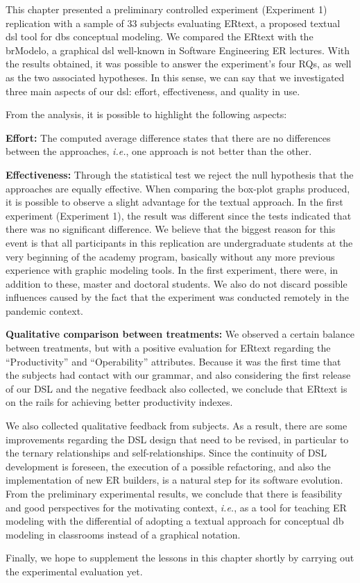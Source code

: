 This chapter presented a preliminary controlled experiment (Experiment 1) replication with a sample of 33 subjects evaluating ERtext, a proposed textual \ac{dsl} tool for \acp{db} conceptual modeling. 
We compared the ERtext with the brModelo, a graphical \ac{dsl} well-known in Software Engineering ER lectures. 
With the results obtained, it was possible to answer the experiment's four RQs, as well as the two associated hypotheses.
In this sense, we can say that we investigated three main aspects of our \ac{dsl}: effort, effectiveness, and quality in use.

From the analysis, it is possible to highlight the following aspects:

\item \textbf{Effort:} The computed average difference states that there are no differences between the approaches, \textit{i.e.}, one approach is not better than the other. 

\item \textbf{Effectiveness:} Through the statistical test we reject the null hypothesis that the approaches are equally effective. 
When comparing the box-plot graphs produced, it is possible to observe a slight advantage for the textual approach. 
In the first experiment (Experiment 1), the result was different since the tests indicated that there was no significant difference. 
We believe that the biggest reason for this event is that all participants in this replication are undergraduate students at the very beginning of the academy program, basically without any more previous experience with graphic modeling tools. 
In the first experiment, there were, in addition to these, master and doctoral students. 
We also do not discard possible influences caused by the fact that the experiment was conducted remotely in the pandemic context.

\item \textbf{Qualitative comparison between treatments:} We observed a certain balance between treatments, but with a positive evaluation for ERtext regarding the ``Productivity'' and ``Operability'' attributes.
Because it was the first time that the subjects had contact with our grammar, and also considering the first release of our DSL and the negative feedback also collected, we conclude that ERtext is on the rails for achieving better productivity indexes.

We also collected qualitative feedback from subjects. 
As a result, there are some improvements regarding the DSL design that need to be revised, in particular to the ternary relationships and self-relationships.
Since the continuity of DSL development is foreseen, the execution of a possible refactoring, and also the implementation of new ER builders, is a natural step for its software evolution.
From the preliminary experimental results, we conclude that there is feasibility and good perspectives for the motivating context, \textit{i.e.}, as a tool for teaching ER modeling with the differential of adopting a textual approach for conceptual \ac{db} modeling in classrooms instead of a graphical notation.

Finally, we hope to supplement the lessons in this chapter shortly by carrying out the experimental evaluation yet.